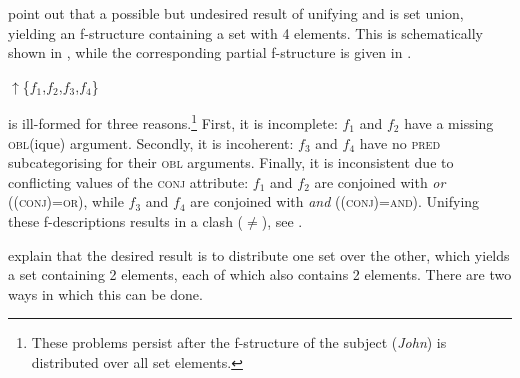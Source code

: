 \documentclass[output=paper]{../langscibook}
\begin{document}
\largerpage
\citet{max:man:96} point out that a
possible but undesired result of unifying 
and  is set union, yielding an f-structure
containing a set with 4 elements. This is schematically shown in
, while the corresponding partial
f-structure is given in .

\ea\label{ex:max:man:96:43:RESULT:union:sch} $\uparrow$\{$f_{1}$,$f_{2}$,$f_{3}$,$f_{4}$\}
\z

 is
ill-formed for three reasons.\footnote{These problems persist
  after the f-structure of the subject
  (\emph{John}) is distributed over all set elements.} First, it is incomplete: $f_{1}$ and $f_{2}$ have
a missing \textsc{obl}(ique) argument. Secondly, it is incoherent: $f_{3}$ and $f_{4}$ have no
\textsc{pred} subcategorising for their \textsc{obl}
arguments. Finally, it is inconsistent due to conflicting values of
the \textsc{conj} attribute: $f_{1}$ and $f_{2}$ are conjoined with \emph{or}
(\textsc{(\UP conj)=or}), while $f_{3}$ and $f_{4}$ are conjoined with
\emph{and} (\textsc{(\UP conj)=and}). Unifying these
f-descriptions results in a clash ($\neq$), see .

\citet{max:man:96} explain that the desired result is to distribute
one set over the other, which yields a set containing 2 elements, each
of which also contains 2 elements. There are two
ways in which this can be done.
\end{document}
